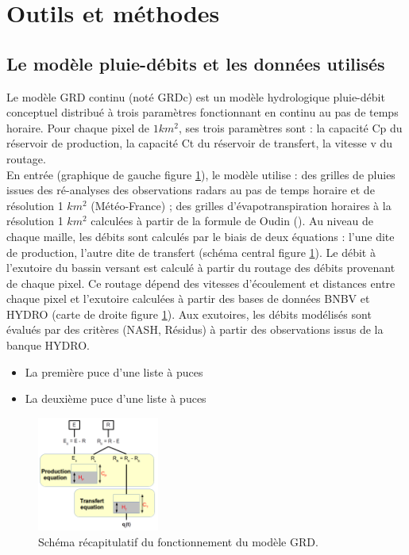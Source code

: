 \documentclass[a4paper,11pt]{article}
\begin{document}
\section{Outils et méthodes}


\subsection{Le modèle pluie-débits et les données utilisés}
Le modèle GRD continu (noté GRDc) est un modèle hydrologique pluie-débit conceptuel distribué à trois paramètres fonctionnant en continu au pas de temps horaire. Pour chaque pixel de $1 km^2$, ses trois paramètres sont : la capacité Cp du réservoir de production, la capacité Ct du réservoir de transfert, la vitesse v du routage.\\
En entrée (graphique de gauche figure \ref{fig:GRD}), le modèle utilise : des grilles de pluies issues des ré-analyses des observations radars au pas de temps horaire et de résolution 1 $km^2$ (Météo-France) ; des grilles d'évapotranspiration horaires à la résolution 1 $km^2$ calculées à partir de la formule de Oudin (\cite{oudin2005potential}). Au niveau de chaque maille, les débits sont calculés par le biais de deux équations : l'une dite de production, l'autre dite de transfert (schéma central figure \ref{fig:GRD}). Le débit à l'exutoire du bassin versant est calculé à partir du routage des débits provenant de chaque pixel. Ce routage dépend des vitesses d'écoulement et distances entre chaque pixel et l'exutoire calculées à partir des bases de données BNBV et HYDRO (carte de droite figure \ref{fig:GRD}). Aux exutoires, les débits modélisés sont évalués par des critères (NASH, Résidus) à partir des observations issus de la banque HYDRO.\\


\begin{itemize}
    \item La première puce d'une liste à puces
    \item La deuxième puce d'une liste à puces
\end{itemize}

\begin{figure}[H]
  \begin{center}
     \includegraphics[width=4cm]{modele_grdc.png}
  \end{center}
  
  \caption{Schéma récapitulatif du fonctionnement du modèle GRD.}
  \label{fig:GRD}
\end{figure} 
\end{document}
